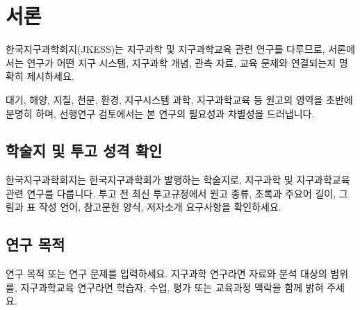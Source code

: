 \section{서론}

한국지구과학회지(JKESS)는 지구과학 및 지구과학교육 관련 연구를 다루므로, 서론에서는 연구가 어떤 지구 시스템, 지구과학 개념, 관측 자료, 교육 문제와 연결되는지 명확히 제시하세요.

대기, 해양, 지질, 천문, 환경, 지구시스템 과학, 지구과학교육 등 원고의 영역을 초반에 분명히 하며, 선행연구 검토에서는 본 연구의 필요성과 차별성을 드러냅니다.

\subsection{학술지 및 투고 성격 확인}

한국지구과학회지는 한국지구과학회가 발행하는 학술지로, 지구과학 및 지구과학교육 관련 연구를 다룹니다. 투고 전 최신 투고규정에서 원고 종류, 초록과 주요어 길이, 그림과 표 작성 언어, 참고문헌 양식, 저자소개 요구사항을 확인하세요.

\subsection{연구 목적}

연구 목적 또는 연구 문제를 입력하세요. 지구과학 연구라면 자료와 분석 대상의 범위를, 지구과학교육 연구라면 학습자, 수업, 평가 또는 교육과정 맥락을 함께 밝혀 주세요.
